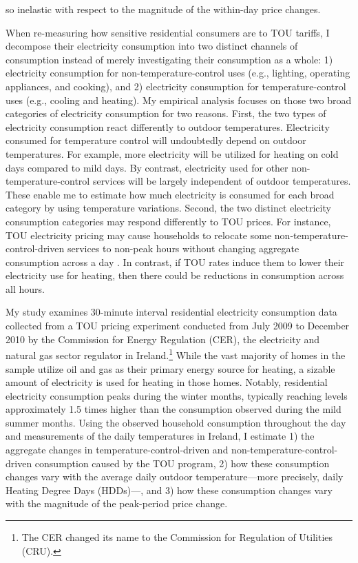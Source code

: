 so inelastic with respect to the magnitude of the within-day price changes. 

When re-measuring how sensitive residential consumers are to TOU tariffs, I decompose their electricity consumption into two distinct channels of consumption instead of merely investigating their consumption as a whole: 1) electricity consumption for non-temperature-control uses (e.g., lighting, operating appliances, and cooking), and 2) electricity consumption for temperature-control uses (e.g., cooling and heating). My empirical analysis focuses on those two broad categories of electricity consumption for two reasons. First, the two types of electricity consumption react differently to outdoor temperatures. Electricity consumed for temperature control will undoubtedly depend on outdoor temperatures. For example, more electricity will be utilized for heating on cold days compared to mild days. By contrast, electricity used for other non-temperature-control services will be largely independent of outdoor temperatures. These enable me to estimate how much electricity is consumed for each broad category by using temperature variations. Second, the two distinct electricity consumption categories may respond differently to TOU prices. For instance, TOU electricity pricing may cause households to relocate some non-temperature-control-driven services to non-peak hours without changing aggregate consumption across a day \citep{Residential-Response-to-Critical-Peak-Pricing-of-Electricity_California-Evidence_Herter-and-Wayland_2010, Empowering-Consumers-through-Data-and-Smart-Technology_HML_2016}. In contrast, if TOU rates induce them to lower their electricity use for heating, then there could be reductions in consumption across all hours. 

My study examines 30-minute interval residential electricity consumption data collected from a TOU pricing experiment conducted from July 2009 to December 2010 by the Commission for Energy Regulation (CER), the electricity and natural gas sector regulator in Ireland.\footnote{The CER changed its name to the Commission for Regulation of Utilities (CRU).} While the vast majority of homes in the sample utilize oil and gas as their primary energy source for heating, a sizable amount of electricity is used for heating in those homes. Notably, residential electricity consumption peaks during the winter months, typically reaching levels approximately 1.5 times higher than the consumption observed during the mild summer months. Using the observed household consumption throughout the day and measurements of the daily temperatures in Ireland, I estimate 1) the aggregate changes in temperature-control-driven and non-temperature-control-driven consumption caused by the TOU program, 2) how these consumption changes vary with the average daily outdoor temperature---more precisely, daily Heating Degree Days (HDDs)---, and 3) how these consumption changes vary with the magnitude of the peak-period price change.  

